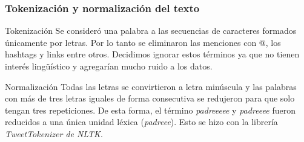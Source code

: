 \begin{frame}[t]\frametitle{Tokenización y normalización del texto}
    \begin{block}{Tokenización}
    Se consideró una palabra a las secuencias de caracteres formados únicamente por letras. Por lo tanto se eliminaron las menciones con @, los hashtags y links entre otros. Decidimos ignorar estos términos ya que no tienen interés lingüístico y agregarían mucho ruido a los datos.
    \end{block}

    \begin{block}{Normalización}
    Todas las letras se convirtieron a letra minúscula y las palabras con más de tres letras iguales de forma consecutiva se redujeron para que solo tengan tres repeticiones. De esta forma, el término \textit{padreeeee} y \textit{padreeee} fueron reducidos a una única unidad léxica (\textit{padreee}). Esto se hizo con la librería \textit{TweetTokenizer de NLTK}. 
    \end{block}

\end{frame}
